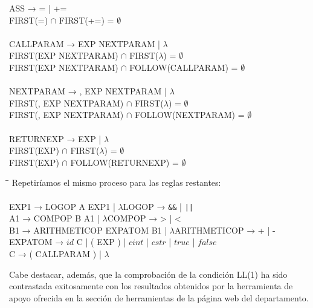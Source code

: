 \begin{tabbing}
    ASS → = | +=\\
    \>FIRST(=) $\cap$ FIRST(+=) = $\emptyset$\\
    \\
    CALLPARAM → EXP NEXTPARAM | $\lambda$\\
    \>FIRST(EXP NEXTPARAM) $\cap$ FIRST($\lambda$) = $\emptyset$\\
    \>FIRST(EXP NEXTPARAM) $\cap$ FOLLOW(CALLPARAM) = $\emptyset$\\
    \\
    NEXTPARAM → , EXP NEXTPARAM | $\lambda$\\
    \>FIRST(, EXP NEXTPARAM) $\cap$ FIRST($\lambda$) = $\emptyset$\\
    \>FIRST(, EXP NEXTPARAM) $\cap$ FOLLOW(NEXTPARAM) = $\emptyset$\\
    \\
    RETURNEXP → EXP | $\lambda$\\
    \>FIRST(EXP) $\cap$ FIRST($\lambda$) = $\emptyset$\\
    \>FIRST(EXP) $\cap$ FOLLOW(RETURNEXP) = $\emptyset$\\
\end{tabbing}
\begin{tabbing}
    \hspace{0.5cm}\=\hspace{10cm}\=\kill
    Repetiríamos el mismo proceso para las reglas restantes:\\
    \\
    \>EXP1 → LOGOP A EXP1 | $\lambda$\>LOGOP → \verb!&&! | \verb!||!\\
    \>A1 → COMPOP B A1 | $\lambda$\>COMPOP → > | <\\
    \>B1 → ARITHMETICOP EXPATOM B1 | $\lambda$\>ARITHMETICOP → + | -\\
    \>EXPATOM → $id$ C | ( EXP ) | $cint$ | $cstr$ | $true$ | $false$\\
    \>C → ( CALLPARAM ) | $\lambda$
\end{tabbing}
Cabe destacar, además, que la comprobación de la condición LL(1) ha sido contrastada exitosamente con los resultados obtenidos por la herramienta de apoyo ofrecida en la sección de herramientas de la página web del departamento.\\
\newpage